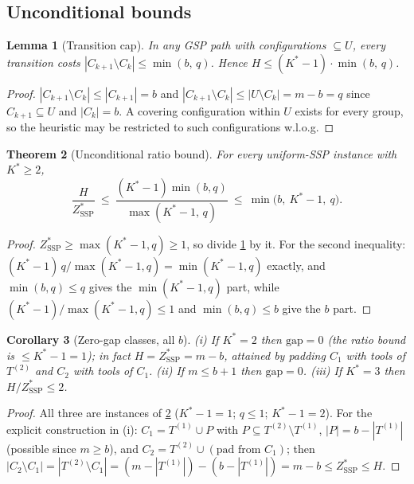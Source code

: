 \documentclass[11pt,a4paper]{article}
\theoremstyle{plain}
\newtheorem{theorem}{Theorem}[section]
\newtheorem{lemma}[theorem]{Lemma}
\newtheorem{corollary}[theorem]{Corollary}
\theoremstyle{definition}
\newcommand{\Kstar}{K^{*}}
\newcommand{\ZSSP}{Z_{\mathrm{SSP}}^{*}}
\begin{document}
\subsection{Unconditional bounds}

\begin{thmbox}
\begin{lemma}[Transition cap]
\label{lem:transcap}
In any GSP path with configurations $\subseteq U$, every transition costs
$|C_{k+1}\setminus C_k|\le\min(b,\,q)$. Hence
$H\le(\Kstar-1)\cdot\min(b,\,q)$.
\end{lemma}
\end{thmbox}
\begin{proofbox}
\begin{proof}
$|C_{k+1}\setminus C_k|\le|C_{k+1}|=b$ and
$|C_{k+1}\setminus C_k|\le|U\setminus C_k|=m-b=q$ since $C_{k+1}\subseteq U$ and
$|C_k|=b$. A covering configuration within $U$ exists for every group, so the heuristic
may be restricted to such configurations w.l.o.g.
\end{proof}
\end{proofbox}

\begin{thmbox}
\begin{theorem}[Unconditional ratio bound]
\label{thm:uncond}
For every uniform-SSP instance with $\Kstar\ge2$,
\[
  \frac{H}{\ZSSP}\ \le\ \frac{(\Kstar-1)\min(b,q)}{\max(\Kstar-1,\,q)}
  \ \le\ \min\bigl(b,\ \Kstar-1,\ q\bigr).
\]
\end{theorem}
\end{thmbox}
\begin{proofbox}
\begin{proof}
$\ZSSP\ge\max(\Kstar-1,q)\ge1$, so divide \cref{lem:transcap} by it. For the second
inequality: $(\Kstar-1)\,q/\max(\Kstar-1,q)=\min(\Kstar-1,q)$ exactly, and
$\min(b,q)\le q$ gives the $\min(\Kstar-1,q)$ part, while
$(\Kstar-1)/\max(\Kstar-1,q)\le1$ and $\min(b,q)\le b$ give the $b$ part.
\end{proof}
\end{proofbox}

\begin{thmbox}
\begin{corollary}[Zero-gap classes, all $b$]
\label{cor:K2}
(i) If $\Kstar=2$ then $\mathrm{gap}=0$ (the ratio bound is $\le\Kstar-1=1$); in fact
$H=\ZSSP=m-b$, attained by padding $C_1$ with tools of $T^{(2)}$ and $C_2$ with tools of
$C_1$. (ii) If $m\le b+1$ then $\mathrm{gap}=0$. (iii) If $\Kstar=3$ then $H/\ZSSP\le2$.
\end{corollary}
\end{thmbox}
\begin{proofbox}
\begin{proof}
All three are instances of \cref{thm:uncond} ($\Kstar-1=1$; $q\le1$; $\Kstar-1=2$).
For the explicit construction in (i): $C_1=T^{(1)}\cup P$ with
$P\subseteq T^{(2)}\setminus T^{(1)}$, $|P|=b-|T^{(1)}|$ (possible since $m\ge b$), and
$C_2=T^{(2)}\cup(\text{pad from }C_1)$; then $|C_2\setminus C_1|=|T^{(2)}\setminus C_1|
=(m-|T^{(1)}|)-(b-|T^{(1)}|)=m-b\le\ZSSP\le H$.
\end{proof}
\end{proofbox}
\end{document}
